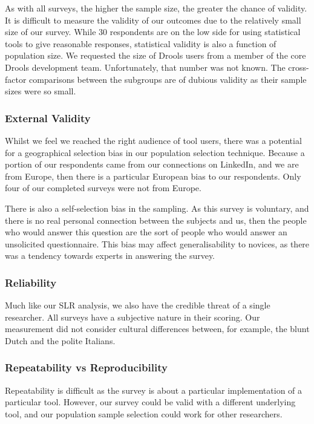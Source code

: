As with all surveys, the higher the sample size, the greater the chance of validity.
It is difficult to measure the validity of our outcomes due to the relatively small size of our survey.
While 30 respondents are on the low side for using statistical tools to give reasonable responses, statistical validity is also a function of population size.
We requested the size of Drools users from a member of the core Drools development team.  
Unfortunately, that number was not known.
The cross-factor comparisons between the subgroups are of dubious validity as their sample sizes were so small.

\subsubsection{External Validity}
Whilst we feel we reached the right audience of tool users, there was a potential for a geographical selection bias in our population selection technique.
Because a portion of our respondents came from our connections on LinkedIn, and we are from Europe, then there is a particular European bias to our respondents.
Only four of our completed surveys were not from Europe.

There is also a self-selection bias in the sampling. 
As this survey is voluntary, and there is no real personal connection between the subjects and us, then the people who would answer this question are the sort of people who would answer an unsolicited questionnaire.
This bias may affect generalisability to novices, as there was a tendency towards experts in answering the survey.

\subsubsection{Reliability}
Much like our SLR analysis, we also have the credible threat of a single researcher.
All surveys have a subjective nature in their scoring.
Our measurement did not consider cultural differences between, for example, the blunt Dutch and the polite Italians.

\subsubsection{Repeatability vs Reproducibility}
Repeatability is difficult as the survey is about a particular implementation of a particular tool.
However, our survey could be valid with a different underlying tool, and our population sample selection could work for other researchers.

